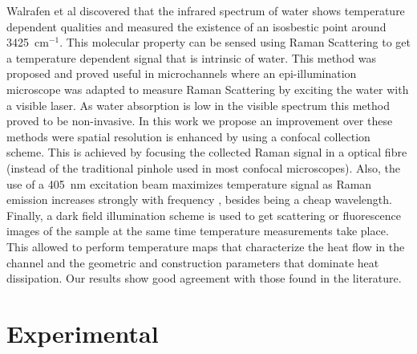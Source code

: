 \documentclass[twocolumn]{svjour3}       %
\begin{document}
Walrafen et al \cite{walrafen1} discovered that the infrared spectrum of water shows temperature dependent qualities and measured the existence of an isosbestic point around 3425~$\mathrm{cm^{-1}}$. This molecular property can be sensed using Raman Scattering to get a temperature dependent signal that is intrinsic of water. This method was proposed and proved useful in microchannels \cite{raman1}\cite{raman2}\cite{raman3} where an epi-illumination microscope was adapted to measure Raman Scattering by exciting the water with a visible laser. As water absorption is low in the visible spectrum \cite{absorption} this method proved to be non-invasive. In this work we propose an improvement over these methods were spatial resolution is enhanced by using a confocal collection scheme. This is achieved by focusing the collected Raman signal in a optical fibre (instead of the traditional pinhole used in most confocal microscopes). Also, the use of a 405~nm excitation beam maximizes temperature signal as Raman emission increases strongly with frequency \cite{faris}, besides being a cheap wavelength. Finally, a dark field illumination scheme is used to get scattering or fluorescence images of the sample at the same time temperature measurements take place. This allowed to perform temperature maps that characterize the heat flow in the channel and the geometric and construction parameters that dominate heat dissipation. Our results show good agreement with those found in the literature. 

\section{Experimental}
\end{document}

